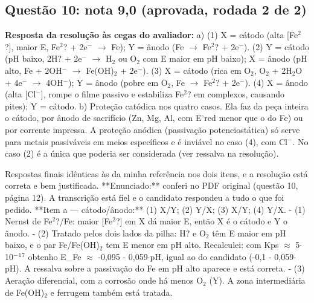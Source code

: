 \documentclass{article}%
\begin{document}
\subsection*{Questão 10: nota 9,0 (aprovada, rodada 2 de 2)}%
\textbf{Resposta da resolução às cegas do avaliador:} a) (1) X = cátodo (alta {[}Fe$^2$?{]}, maior E, Fe$^2$? + 2e$^{-}$ $\to$ Fe); Y = ânodo (Fe $\to$ Fe$^2$? + 2e$^{-}$). (2) Y = cátodo (pH baixo, 2H? + 2e$^{-}$ $\to$ H$_{2}$ ou O$_{2}$ com E maior em pH baixo); X = ânodo (pH alto, Fe + 2OH$^{-}$ $\to$ Fe(OH)$_{2}$ + 2e$^{-}$). (3) X = cátodo (rica em O$_{2}$, O$_{2}$ + 2H$_{2}$O + 4e$^{-}$ $\to$ 4OH$^{-}$); Y = ânodo (pobre em O$_{2}$, Fe $\to$ Fe$^2$? + 2e$^{-}$). (4) X = ânodo (alta {[}Cl$^{-}${]}, rompe o filme passivo e estabiliza Fe$^2$? em complexos, causando pites); Y = cátodo.\newline%
\newline%
b) Proteção catódica nos quatro casos. Ela faz da peça inteira o cátodo, por ânodo de sacrifício (Zn, Mg, Al, com E$^\circ$red menor que o do Fe) ou por corrente impressa. A proteção anódica (passivação potenciostática) só serve para metais passiváveis em meios específicos e é inviável no caso (4), com Cl$^{-}$. No caso (2) é a única que poderia ser considerada (ver ressalva na resolução).\par %
Respostas finais idênticas às da minha referência nos dois itens, e a resolução está correta e bem justificada.\newline%
\newline%
**Enunciado:** conferi no PDF original (questão 10, página 12). A transcrição está fiel e o candidato respondeu a tudo o que foi pedido.\newline%
\newline%
**Item a --- cátodo/ânodo:** (1) X/Y; (2) Y/X; (3) X/Y; (4) Y/X.\newline%
{-} (1) Nernst de Fe$^2$?/Fe: maior {[}Fe$^2$?{]} em X dá maior E, então X é o cátodo e Y o ânodo.\newline%
{-} (2) Tratado pelos dois lados da pilha: H? e O$_{2}$ têm E maior em pH baixo, e o par Fe/Fe(OH)$_{2}$ tem E menor em pH alto. Recalculei: com Kps $\approx$ 5$\cdot$10$^{-}$$^{1}$$^{7}$ obtenho E\_Fe $\approx$ -0,095 - 0,059$\cdot$pH, igual ao do candidato (-0,1 - 0,059$\cdot$pH). A ressalva sobre a passivação do Fe em pH alto aparece e está correta.\newline%
{-} (3) Aeração diferencial, com a corrosão onde há menos O$_{2}$ (Y). A zona intermediária de Fe(OH)$_{2}$ e ferrugem também está tratada.\newline%
\end{document}
